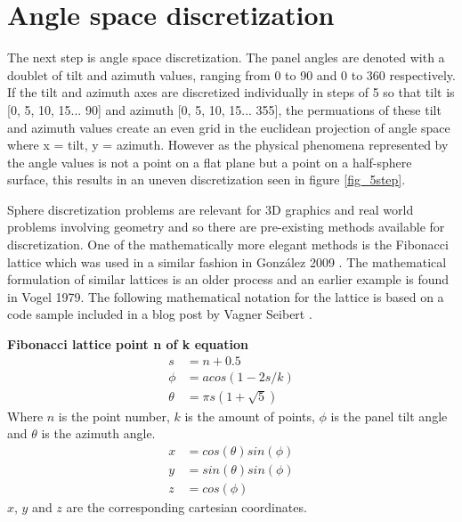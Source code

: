 \section{Angle space discretization}\label{angle_space_discretization}
The next step is angle space discretization. The panel angles are denoted with a doublet of tilt and azimuth values, ranging from 0 to 90 and 0 to 360 respectively. If the tilt and azimuth axes are discretized individually in steps of 5 so that tilt is [0, 5, 10, 15... 90] and azimuth [0, 5, 10, 15... 355], the permuations of these tilt and azimuth values create an even grid in the euclidean projection of angle space where x = tilt, y = azimuth. However as the physical phenomena represented by the angle values is not a point on a flat plane but a point on a half-sphere surface, this results in an uneven discretization seen in figure \ref{fig_5step}. 

Sphere discretization problems are relevant for 3D graphics and real world problems involving geometry and so there are pre-existing methods available for discretization. One of the mathematically more elegant methods is the Fibonacci lattice which was used in a similar fashion in González 2009 \cite{Gonzlez}. The mathematical formulation of similar lattices is an older process and an earlier example is found in Vogel 1979\cite{fibolat_old}. The following mathematical notation for the lattice is based on a code sample included in a blog post by Vagner Seibert \cite{medium_fibolat_equation}.




\noindent \textbf{Fibonacci lattice point n of k equation}
\begin{align}
	s &= n + 0.5 \\
	\phi &= acos(1 - 2 s / k) \\
	\theta &= \pi s (1 + \sqrt{5})
\end{align}
Where $n$ is the point number, $k$ is the amount of points, $\phi$ is the panel tilt angle and $\theta$ is the azimuth angle.
\begin{align}
	x &= cos(\theta)sin(\phi)\\
	y &= sin(\theta)sin(\phi)\\
	z &= cos(\phi)
\end{align}
$x$, $y$ and $z$ are the corresponding cartesian coordinates.
\vspace{5mm}


